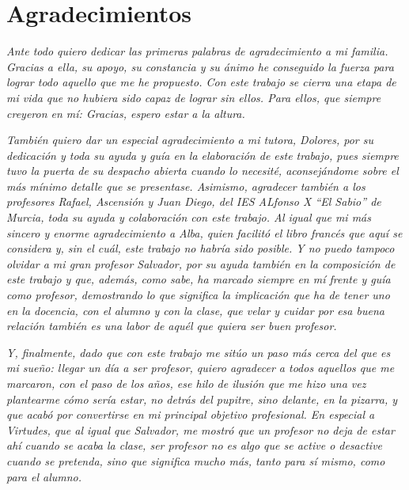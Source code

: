 \chapter*{Agradecimientos}

	\textit{Ante todo quiero dedicar las primeras palabras de agradecimiento a mi familia. Gracias a ella, su apoyo, su constancia y su ánimo he conseguido la fuerza para lograr todo aquello que me he propuesto. Con este trabajo se cierra una etapa de mi vida que no hubiera sido capaz de lograr sin ellos. Para ellos, que siempre creyeron en mí: Gracias, espero estar a la altura.}
	
	\textit{También quiero dar un especial agradecimiento a mi tutora, Dolores, por su dedicación y toda su ayuda y guía en la elaboración de este trabajo, pues siempre tuvo la puerta de su despacho abierta cuando lo necesité, aconsejándome sobre el más mínimo detalle que se presentase. Asimismo, agradecer también a los profesores Rafael, Ascensión y Juan Diego, del IES ALfonso X ``El Sabio'' de Murcia, toda su ayuda y colaboración con este trabajo. Al igual que mi más sincero y enorme agradecimiento a Alba, quien facilitó el libro francés que aquí se considera y, sin el cuál, este trabajo no habría sido posible. Y no puedo tampoco olvidar a mi gran profesor Salvador, por su ayuda también en la composición de este trabajo y que, además, como sabe, ha marcado siempre en mí frente y guía como profesor, demostrando lo que significa la implicación que ha de tener uno en la docencia, con el alumno y con la clase, que velar y cuidar por esa buena relación también es una labor de aquél que quiera ser buen profesor.}
	
	\textit{Y, finalmente, dado que con este trabajo me sitúo un paso más cerca del que es mi sueño: llegar un día a ser profesor, quiero agradecer a todos aquellos que me marcaron, con el paso de los años, ese hilo de ilusión que me hizo una vez plantearme cómo sería estar, no detrás del pupitre, sino delante, en la pizarra, y que acabó por convertirse en mi principal objetivo profesional. En especial a Virtudes, que al igual que Salvador, me mostró que un profesor no deja de estar ahí cuando se acaba la clase, ser profesor no es algo que se active o desactive cuando se pretenda, sino que significa mucho más, tanto para sí mismo, como para el alumno.}








